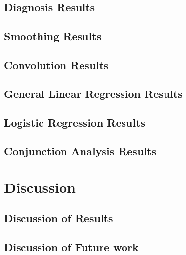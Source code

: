 \documentclass[11pt]{article}
\begin{document}
    \subsection{Diagnosis Results}
            
    \subsection{Smoothing Results}
            
    \subsection{Convolution Results}
            
    \subsection{General Linear Regression Results}
            
    \subsection{Logistic Regression Results}
            
    \subsection{Conjunction Analysis Results}
            

\section{Discussion}

    \subsection{Discussion of Results}
            
    \subsection{Discussion of Future work}
            


\end{document}
